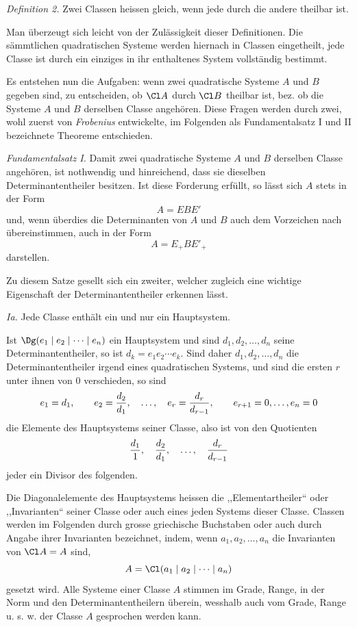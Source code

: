 \emph{Definition 2.} Zwei Classen heissen gleich, wenn jede durch die andere theilbar ist.

Man überzeugt sich leicht von der Zulässigkeit dieser Definitionen. Die sämmtlichen quadratischen Systeme werden hiernach in Classen eingetheilt, jede Classe ist durch ein einziges in ihr enthaltenes System vollständig bestimmt.

Es entstehen nun die Aufgaben: wenn zwei quadratische Systeme $A$ und $B$ gegeben sind, zu entscheiden, ob $\Cl A$ durch $\Cl B$ theilbar ist, bez. ob die Systeme $A$ und $B$ derselben Classe angehören. Diese Fragen werden durch zwei, wohl zuerst von \emph{Frobenius} entwickelte, im Folgenden als Fundamentalsatz I und II bezeichnete Theoreme entschieden.

\emph{Fundamentalsatz I.} Damit zwei quadratische Systeme $A$ und $B$ derselben Classe angehören, ist nothwendig und hinreichend, dass sie dieselben Determinantentheiler besitzen. Ist diese Forderung erfüllt, so lässt sich $A$ stets in der Form
\[
 A=EBE'
\]
und, wenn überdies die Determinanten von $A$ und $B$ auch dem Vorzeichen nach übereinstimmen, auch in der Form
\[
 A=E_+BE'_+
\]
darstellen.

Zu diesem Satze gesellt sich ein zweiter, welcher zugleich eine wichtige Eigenschaft der Determinantentheiler erkennen lässt.

\emph{Ia.} Jede Classe enthält ein und nur ein Hauptsystem.

Ist $\Dg(e_1\mid e_2\mid\cdots\mid e_n)$ ein Hauptsystem und sind $d_1,d_2,\ldots,d_n$ seine Determinantentheiler, so ist $d_k=e_1e_2\cdots e_k$. Sind daher $d_1,d_2,\ldots,d_n$ die Determinantentheiler irgend eines quadratischen Systems, und sind die ersten $r$ unter ihnen von 0 verschieden, so sind
\[
 e_1=d_1,\qquad e_2={d_2\over d_1},\quad \ldots,\quad e_r={d_r\over d_{r-1}},\qquad e_{r+1}=0,\ldots,e_n=0
\]
die Elemente des Hauptsystems seiner Classe, also ist von den Quotienten
\[
 {d_1\over 1},\quad {d_2\over d_1},\quad \ldots,\quad {d_r\over d_{r-1}}
\]
jeder ein Divisor des folgenden.

Die Diagonalelemente des Hauptsystems heissen die ,,Elementartheiler`` oder ,,Invarianten`` seiner Classe oder auch eines jeden Systems dieser Classe. Classen werden im Folgenden durch grosse griechische Buchstaben oder auch durch Angabe ihrer Invarianten bezeichnet, indem, wenn $a_1,a_2,\ldots,a_n$ die Invarianten von $\Cl A=A$ sind,
\[
 A=\Cl(a_1\mid a_2\mid\cdots\mid a_n)
\]
gesetzt wird. Alle Systeme einer Classe $A$ stimmen im Grade, Range, in der Norm und den Determinantentheilern überein, wesshalb auch vom Grade, Range u. s. w. der Classe $A$ gesprochen werden kann.

